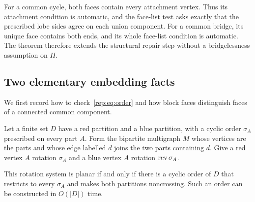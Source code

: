For a common cycle, both faces contain every attachment vertex.  Thus its
attachment condition is automatic, and the face-list test asks exactly that
the prescribed lobe sides agree on each union component.  For a common
bridge, its unique face contains both ends, and its whole face-list condition
is automatic.  The theorem therefore extends the structural repair step
without a bridgelessness assumption on $H$.

\subsection{Two elementary embedding facts}
\label{rep:elementary}

We first record how to check~\eqref{rep:eq:order} and how block faces distinguish
faces of a connected common component.

\begin{lemma}
\label{rep:lem:two-partitions}
Let a finite set $D$ have a red partition and a blue partition, with a cyclic
order $\sigma_A$ prescribed on every part $A$.  Form the bipartite multigraph
$M$ whose vertices are the parts and whose edge labelled $d$ joins the two
parts containing $d$.  Give a red vertex $A$ rotation $\sigma_A$ and a blue
vertex $A$ rotation $\operatorname{rev}\sigma_A$.

This rotation system is planar if and only if there is a cyclic order of $D$
that restricts to every $\sigma_A$ and makes both partitions noncrossing.
Such an order can be constructed in $O(|D|)$ time.
\end{lemma}

